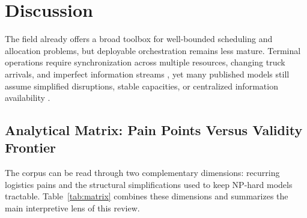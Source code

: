 \documentclass[preprint,12pt,number,longtitle]{elsarticle}
\begin{document}
\FloatBarrier

\section{Discussion}

The field already offers a broad toolbox for well-bounded scheduling and allocation problems, but deployable orchestration remains less mature. Terminal operations require synchronization across multiple resources, changing truck arrivals, and imperfect information streams \cite{nasiri2022,fonseca2024,abbas2018}, yet many published models still assume simplified disruptions, stable capacities, or centralized information availability \cite{banyai2025,rostami2022,essghaier2023,cota2022}.

\subsection{Analytical Matrix: Pain Points Versus Validity Frontier}

The corpus can be read through two complementary dimensions: recurring logistics pains and the structural simplifications used to keep NP-hard models tractable. Table~\ref{tab:matrix} combines these dimensions and summarizes the main interpretive lens of this review.
\end{document}
